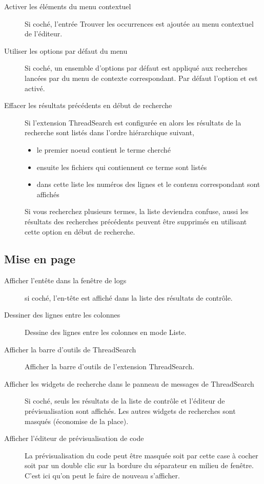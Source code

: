 \begin{description}
\item[Activer les éléments du menu contextuel ] Si coché, l'entrée Trouver les occurrences est ajoutée au menu contextuel de l'éditeur.
\item[Utiliser les options par défaut du menu ] Si coché, un ensemble d'options par défaut est appliqué aux recherches lancées par  du menu de contexte correspondant. Par défaut l'option  et  est activé.
\item[Effacer les résultats précédents en début de recherche] Si l'extension ThreadSearch est configurée en  alors les résultats de la recherche sont listés dans l'ordre hiérarchique suivant,
\begin{itemize}
\item le premier noeud contient le terme cherché
\item ensuite les fichiers qui contiennent ce terme sont listés
\item dans cette liste les numéros des lignes et le contenu correspondant sont affichés
\end{itemize}
Si vous recherchez plusieurs termes, la liste deviendra confuse, aussi les résultats des recherches précédents peuvent être supprimés en utilisant cette option en début de recherche.
\end{description}

\subsection{Mise en page}

\begin{description}
\item[Afficher l'entête dans la fenêtre de logs] si coché, l'en-tête est affiché dans la liste des résultats de contrôle.
\item[Dessiner des lignes entre les colonnes] Dessine des lignes entre les colonnes en mode Liste.
\item[Afficher la barre d'outils de ThreadSearch] Afficher la barre d'outils de l'extension ThreadSearch.
\item[Afficher les widgets de recherche dans le panneau de messages de ThreadSearch] Si coché, seuls les résultats de la liste de contrôle et l'éditeur de prévisualisation sont affichés. Les autres widgets de recherches sont masqués (économise de la place).
\item[Afficher l'éditeur de prévisualisation de code] La prévisualisation du code peut être masquée soit par cette case à cocher soit par un double clic sur la bordure du séparateur en milieu de fenêtre. C'est ici qu'on peut le faire de nouveau s'afficher.
\end{description}


